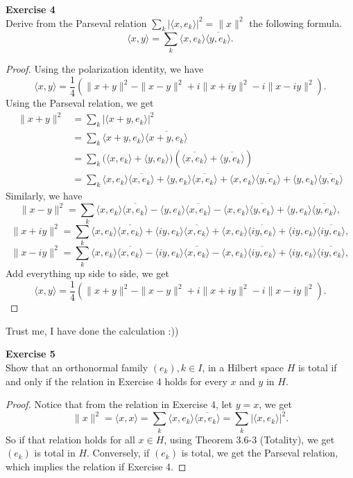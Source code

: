 \documentclass[12pt, a4paper]{article}
\theoremstyle{plain}
\newenvironment{exercise}[2][Exercise]
    { \begin{mdframed}[backgroundcolor=gray!20] \textbf{#1 #2} \\}
    {  \end{mdframed}}
\begin{document}
\begin{exercise}{4}
Derive from the Parseval relation $\sum_{k}{|\langle{x,e_k}\rangle|^2} = \|x\|^2$ the following formula.
\[
\langle{x,y}\rangle = \sum_{k}{\langle{x,e_k}\rangle\overline{\langle{y,e_k}\rangle}}.
\]
\end{exercise}
	\begin{proof}
	Using the polarization identity, we have
	\[
	\langle{x,y}\rangle = \frac{1}{4}(\|x+y\|^2 - \|x-y\|^2 + i\|x+iy\|^2 - i\|x-iy\|^2).
	\]
	Using the Parseval relation, we get
	\begin{align*}
	\|x+y\|^2 &= \sum_k{|\langle{x+y,e_k}\rangle|^2}\\
	&= \sum_k{\langle{x+y,e_k}\rangle\overline{\langle{x+y,e_k}\rangle}}\\
	&= \sum_k{(\langle{x,e_k}\rangle+\langle{y,e_k}\rangle})(\overline{\langle{x,e_k}\rangle}+\overline{\langle{y,e_k}\rangle})\\
	&= \sum_k{
	\langle{x,e_k}\rangle\overline{\langle{x,e_k}\rangle} + \langle{y,e_k}\rangle\overline{\langle{x,e_k}\rangle} + \langle{x,e_k}\rangle\overline{\langle{y,e_k}\rangle} + \langle{y,e_k}\rangle\overline{\langle{y,e_k}\rangle}
	}
	\end{align*}
	Similarly, we have
	\[
	\|x-y\|^2 = \sum_k\langle{x,e_k}\rangle\overline{\langle{x,e_k}\rangle} - \langle{y,e_k}\rangle\overline{\langle{x,e_k}\rangle} - \langle{x,e_k}\rangle\overline{\langle{y,e_k}\rangle} + \langle{y,e_k}\rangle\overline{\langle{y,e_k}\rangle},
	\]
	\[
	\|x+iy\|^2 = \sum_k\langle{x,e_k}\rangle\overline{\langle{x,e_k}\rangle} + \langle{iy,e_k}\rangle\overline{\langle{x,e_k}\rangle} + \langle{x,e_k}\rangle\overline{\langle{iy,e_k}\rangle} + \langle{iy,e_k}\rangle\overline{\langle{iy,e_k}\rangle},
	\]
	\[
	\|x-iy\|^2 = \sum_k\langle{x,e_k}\rangle\overline{\langle{x,e_k}\rangle} - \langle{iy,e_k}\rangle\overline{\langle{x,e_k}\rangle} - \langle{x,e_k}\rangle\overline{\langle{iy,e_k}\rangle} + \langle{iy,e_k}\rangle\overline{\langle{iy,e_k}\rangle},
	\]
	Add everything up side to side, we get
	\[
	\langle{x,y}\rangle = \frac{1}{4}(\|x+y\|^2 - \|x-y\|^2 + i\|x+iy\|^2 - i\|x-iy\|^2).
	\]
	\end{proof}
Trust me, I have done the calculation :))
\begin{exercise}{5}
Show that an orthonormal family $(e_k),k\in I$, in a Hilbert space $H$ is total if and only if the relation in Exercise 4 holds for every $x$ and $y$ in $H$.
\end{exercise}
	\begin{proof}
	Notice that from the relation in Exercise 4, let $y=x$, we get
	\[
	\|x\|^2 = \langle{x,x}\rangle = \sum_{k}{\langle{x,e_k}\rangle\overline{\langle{x,e_k}\rangle}} = \sum_{k}{|\langle{x,e_k}\rangle|^2}.
	\]
	So if that relation holds for all $x\in H$, using Theorem 3.6-3 (Totality), we get $(e_k)$ is total in $H$. Conversely, if $(e_k)$ is total, we get the Parseval relation, which implies the relation if Exercise 4.
	\end{proof}
	
\end{document}
